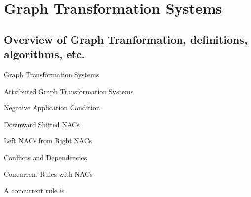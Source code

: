 \chapter{Graph Transformation Systems}

\section{Overview of Graph Tranformation, definitions, algorithms, etc.}

\begin{mydef}{Graph Transformation Systems}
\end{mydef}

\begin{mydef}{Attributed Graph Transformation Systems}
\end{mydef}

\begin{mydef}{Negative Application Condition}

\centerline{}

\end{mydef}

\begin{mydef}{Downward Shifted NACs}

\centerline{}


\end{mydef}

\begin{mydef}{Left NACs from Right NACs}

\centerline{}

\end{mydef}

\begin{mydef}{Conflicts and Dependencies}
\end{mydef}

\begin{mydef}{Concurrent Rules with NACs}

A concurrent rule is
\end{mydef}

\centerline{
}

